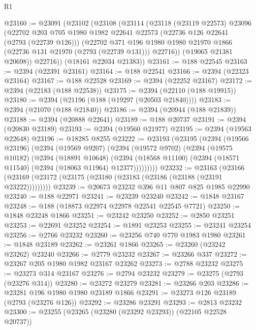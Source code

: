 \begin{lexlean}{R1}
\begin{coremodule}
@23160 := @23091
    (@23102
      (@23108
        (@23114
          (@23118
            (@23119 @22573)
            @23096
            (@22702
              @203
              @705
              @1980
              @1982
              @22641
              @22573
              (@22736 @126 @22641 (@2793 (@22739 @126)))
              (@22702
                @371
                @196
                @1980
                @1980
                @21970
                @1866
                (@22736 @131 @21970 (@2793 (@22739 @131)))
                @22716))
            (@19065 @21381 @20698))
          @22716))
      (@18161 @22034 @21383))
@23161 := @188 @22545
@23163 := @2394 (@22391 @23161)
@23164 := @188 @22541
@23166 := @2394 (@22323 @23164)
@23167 := @188 @22528
@23169 := @2394 (@22252 @23167)
@23172 := @2394 (@22183 (@188 @22538))
@23175 := @2394 (@22110 (@188 @19915))
@23180 := @2394 (@21196 (@188 (@19297 (@20503 @21840))))
@23183 := @2394 (@21070 (@188 @21840))
@23186 := @2394 (@20944 (@188 @21839))
@23188 := @2394 (@20888 @22641)
@23189 := @188 @20737
@23191 := @2394 (@20830 @23189)
@23193 := @2394 (@19560 @21977)
@23195 := @2394 (@19563 @22648)
@23196 := @18285 @8255
@23222 := @23193
    (@23195
      (@2394
        (@19566 @23196)
        (@2394
          (@19569 @9207)
          (@2394
            (@19572 @9702)
            (@2394
              (@19575 @10182)
              (@2394
                (@18891 @10648)
                (@2394 (@18568 @11100) (@2394 (@18571 @11540) (@2394 (@18063 @11964) @12377)))))))))
@23232 := @23163
    (@23166 (@23169 (@23172 (@23175 (@23180 (@23183 (@23186 (@23188 (@23191 @23222)))))))))
@23239 := @20673 @23232 @396 @11 @807 @825 @1985 @22990
@23240 := @188 @22971
@23241 := @23239 @23240
@23242 := @1848 @23167
@23248 := @188 (@18873 @22974 @22978 @22541 @22545 @7721)
@23250 := @1848 @23248 @1866
@23251 := @23242 @23250
@23252 := @2850 @23251
@23253 := @22691 @23252
@23254 := @1891 @23253
@23255 := @23241 @23254
@23256 := @2766 @23232
@23260 := @23256 @740 @770 @1983 @1980
@23261 := @1848 @23189
@23262 := @23261 @1866
@23265 := @23260 (@23242 @23262) @23240
@23266 := @2779 @23232
@23267 := @23266 @337
@23272 := @23267 @205 @1980 @1982 @23167 @23262
@23273 := @2788 @23232
@23275 := @23273 @314 @23167
@23276 := @2794 @23232
@23279 := @23275 (@2793 (@23276 @314))
@23280 := @23272 @23279
@23281 := @23266 @203
@23286 := @23281 @196 @1980 @1980 @23189 @1866
@23291 := @23273 @126 @23189 (@2793 (@23276 @126))
@23292 := @23286 @23291
@23293 := @2813 @23232
@23300 := @23255 (@23265 (@23280 (@23292 @23293)) (@22105 @22528 @20737))

\end{coremodule}
\end{lexlean}
